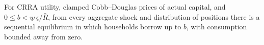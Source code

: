 \begin{theorem}\label{thm:borrow}
For CRRA utility, clamped Cobb--Douglas prices of actual capital, and $0\le b<\underline
w\,\underline\epsilon/\bar R$, from every aggregate shock and distribution of positions there is a
sequential equilibrium in which households borrow up to $b$, with consumption bounded away from
zero.
\end{theorem}
